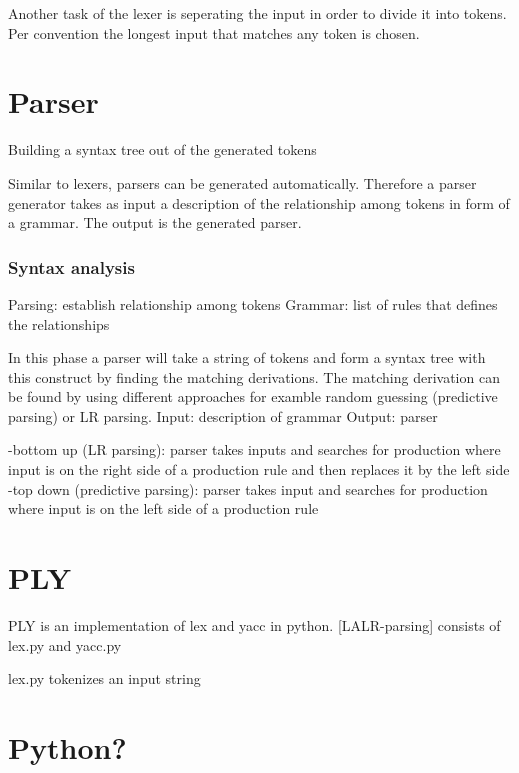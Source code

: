 Another task of the lexer is seperating the input in order to divide it into tokens.
Per convention the longest input that matches any token is chosen. \cite{Mogensen.2017}






\section{Parser}\label{sec:BackgroundParser}
Building a syntax tree out of the generated tokens \cite{Mogensen.2017}

Similar to lexers, parsers can be generated automatically.
Therefore a parser generator takes as input a description of the relationship among tokens in form of a grammar. The output is the generated parser. \cite{LexYacc.1992}
 
\subsubsection{Syntax analysis}
Parsing: establish relationship among tokens \cite{LexYacc.1992}
Grammar: list of rules that defines the relationships \cite{LexYacc.1992}

In this phase a parser will take a string of tokens and form a syntax tree with this construct by finding the matching derivations. The matching derivation can be found by using different approaches for examble random guessing (predictive parsing) or LR parsing.
Input: description of grammar \cite{LexYacc.1992}
Output: parser \cite{LexYacc.1992}

-bottom up (LR parsing):
parser takes inputs and searches for production where input is on the right side of a production rule and then replaces it by the left side
-top down (predictive parsing):
parser takes input and searches for production where input is on the left side of a production rule


\section{PLY}\label{sec:BackgroundPLY}

\acf{PLY} \cite{PLY} is an implementation of lex and yacc in python.
[LALR-parsing]
consists of lex.py and yacc.py

lex.py tokenizes an input string\label{sec:BackgroundNDAutomata}

\section{Python?}\label{sec:BackgroundPython}